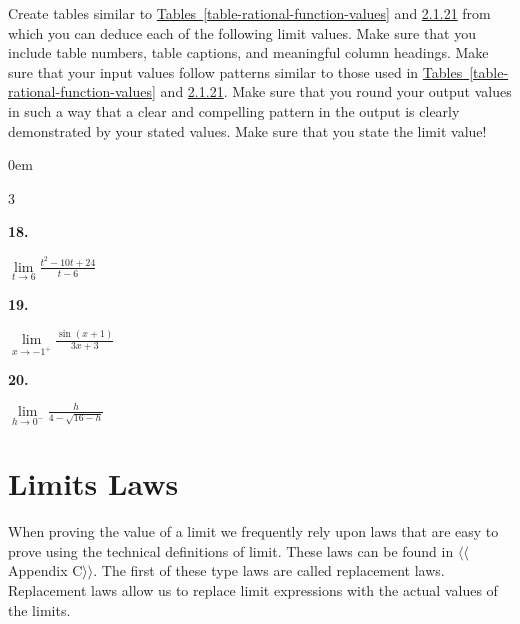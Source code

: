 \documentclass[12pt,]{book}
\theoremstyle{plain}
\theoremstyle{definition}
\numberwithin{equation}{section}
\newenvironment{exercisegroup}%
{\medskip\noindent}%
{\par\bigskip}%
\newlength{\exercisegroupindent}%
\newlength{\exercisegroupitemwidth}%
\newenvironment{exercisegrouplist}%
{\vspace{-\partopsep}%
\begin{adjustwidth}{\exercisegroupindent}{0em}}%
{\end{adjustwidth}%
\vspace{-\partopsep}%
\vspace{\baselineskip}}%
\newenvironment{exercisegroupbycol}[1]%
{\begin{exercisegrouplist}%
\vspace{-\multicolsep}%
\begin{multicols}{#1}%
\setlength{\parindent}{0em}%
\setlength{\exercisegroupitemwidth}{\linewidth}}%
{\end{multicols}%
\vspace{-\multicolsep}%
\end{exercisegrouplist}}%
\newenvironment{exercisegroupitem}[1]%
{\begin{minipage}[t]{\exercisegroupitemwidth}
\vspace{0pt}%
{\bfseries#1}%
\rule{0pt}{\baselineskip}}{\strut%
\end{minipage}%
\hspace{\columnsep}}%
\providecommand\phantomsection{}
\begin{document}
\begin{exercisegroup}%
Create tables similar to \hyperref[table-rational-function-values]{Tables~\ref*{table-rational-function-values}} and \hyperref[table-square-root-values]{2.1.21} from which you can deduce each of the following limit values. Make sure that you include table numbers, table captions, and meaningful column headings. Make sure that your input values follow patterns similar to those used in \hyperref[table-rational-function-values]{Tables~\ref*{table-rational-function-values}} and \hyperref[table-square-root-values]{2.1.21}. Make sure that you round your output values in such a way that a clear and compelling pattern in the output is clearly demonstrated by your stated values. Make sure that you state the limit value!%
\par
\begin{exercisegroupbycol}{3}%
\begin{exercisegroupitem}{18. }\phantomsection\hypertarget{exercise-63}{\null}
\(\lim\limits_{t\to6}\frac{t^2-10t+24}{t-6}\)%
\end{exercisegroupitem}%
\par%
\begin{exercisegroupitem}{19. }\phantomsection\hypertarget{exercise-64}{\null}
\(\lim\limits_{x\to-1^{+}}\frac{\sin(x+1)}{3x+3}\)%
\end{exercisegroupitem}%
\par%
\begin{exercisegroupitem}{20. }\phantomsection\hypertarget{exercise-65}{\null}
\(\lim\limits_{h\to0^{-}}\frac{h}{4-\sqrt{16-h}}\)%
\end{exercisegroupitem}%
\par%
\end{exercisegroupbycol}%
\end{exercisegroup}%
\typeout{************************************************}
\typeout{************************************************}
\section[Limits Laws]{Limits Laws}\label{section-limit-laws}
When proving the value of a limit we frequently rely upon laws that are easy to prove using the technical definitions of limit. These laws can be found in {$\langle\langle$Appendix C$\rangle\rangle$}. The first of these type laws are called replacement laws. Replacement laws allow us to replace limit expressions with the actual values of the limits.%
\typeout{************************************************}
\typeout{************************************************}
\end{document}
